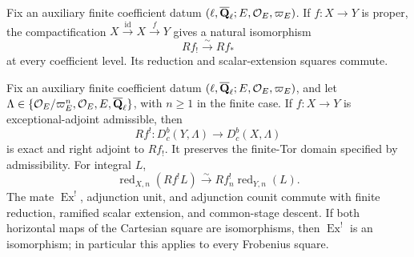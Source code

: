 
\begin{proposition}
\label{prop:proper-operation-comparison}


Fix an auxiliary finite coefficient datum
\((\ell,\overline{\mathbf Q}_\ell;E,\mathcal O_E,\varpi_E)\).  If \(f:X\to Y\) is proper, the compactification
\(X\xrightarrow{\operatorname{id}}X\xrightarrow{f}Y\) gives a natural
isomorphism
\[
 Rf_!\xrightarrow{\sim}Rf_*
\]
at every coefficient level.  Its reduction and scalar-extension squares
commute.
\end{proposition}


\begin{proposition}
\label{prop:exceptional-pullback-constructibility}


Fix an auxiliary finite coefficient datum
\((\ell,\overline{\mathbf Q}_\ell;E,\mathcal O_E,\varpi_E)\), and let
\(\Lambda\in\{\mathcal O_E/\varpi_E^n,\mathcal O_E,E,\overline{\mathbf Q}_\ell\}\), with
\(n\geq1\) in the finite case.  If \(f:X\to Y\) is exceptional-adjoint
admissible, then
\[
 Rf^!:D^b_c(Y,\Lambda)\longrightarrow D^b_c(X,\Lambda)
\]
is exact and right adjoint to \(Rf_!\).  It preserves the finite-Tor domain
specified by admissibility.  For integral \(L\),
\[
 \operatorname{red}_{X,n}(Rf^!L)
 \xrightarrow{\sim}Rf_n^!\operatorname{red}_{Y,n}(L).
\]
The mate \(\operatorname{Ex}^{!}\), adjunction unit, and adjunction counit
commute with finite reduction, ramified scalar extension, and common-stage
descent.
If both horizontal maps of the Cartesian square are isomorphisms, then
\(\operatorname{Ex}^{!}\) is an isomorphism; in particular this applies to
every Frobenius square.
\end{proposition}


